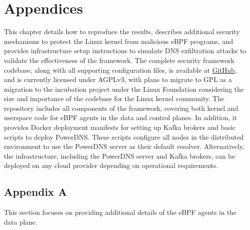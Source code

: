 \documentclass [11pt, proquest] {uwthesis}[2020/02/24]
\begin{document}
 





\chapter{Appendices}

This chapter details how to reproduce the results, describes additional security mechanisms to protect the Linux kernel from malicious eBPF programs, and provides infrastructure setup instructions to simulate DNS exfiltration attacks to validate the effectiveness of the framework.
The complete security framework codebase, along with all supporting configuration files, is available at \href{https://github.com/Synarcs/DNSObelisk}{GitHub}, and is currently licensed under AGPLv3, with plans to migrate to GPL as a migration to the incubation project under the Linux Foundation considering the size and importance of the codebase for the Linux kernel community. The repository includes all components of the framework, covering both kernel and userspace code for eBPF agents in the data and control planes. In addition, it provides Docker deployment manifests for setting up Kafka brokers and basic scripts to deploy PowerDNS. These scripts configure all nodes in the distributed environment to use the PowerDNS server as their default resolver. Alternatively, the infrastructure, including the PowerDNS server and Kafka brokers, can be deployed on any cloud provider depending on operational requirements.


\section{Appendix A}
This section focuses on providing additional details of the eBPF agents in the data plane.
\end{document}
